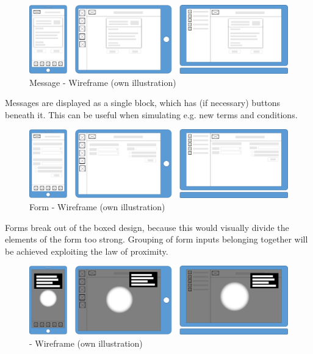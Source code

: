 \begin{figure}[H]
    \centering
    \includegraphics[width=\textwidth]{img/diagrams/wireframes/message.png}
    \caption[Message - Wireframe]{Message - Wireframe (own illustration)}
    \label{fig:}
\end{figure}
Messages are displayed as a single block, which has (if necessary) buttons beneath it. This can be useful when simulating e.g. new terms and conditions.
\begin{figure}[H]
    \centering
    \includegraphics[width=\textwidth]{img/diagrams/wireframes/formular.png}
    \caption[Form - Wireframe]{Form - Wireframe (own illustration)}
    \label{fig:}
\end{figure}
Forms break out of the boxed design, because this would visually divide the elements of the form too strong. Grouping of form inputs belonging together will be achieved exploiting the law of proximity.
\begin{figure}[H]
    \centering
    \includegraphics[width=\textwidth]{img/diagrams/wireframes/hint.png}
    \caption[Hint - Wireframe]{ - Wireframe (own illustration)}
    \label{fig:}
\end{figure}
